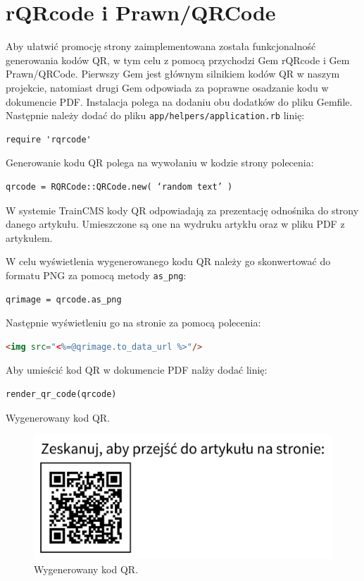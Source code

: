 \documentclass[openright]{xmgr}
\begin{document}
\newpage

\section{rQRcode i Prawn/QRCode}
Aby ułatwić promocję strony zaimplementowana została funkcjonalność generowania kodów QR, w tym celu z pomocą przychodzi Gem rQRcode\cite{rqrcode} i Gem Prawn/QRCode\cite{prawnqr}. Pierwszy Gem jest głównym silnikiem kodów QR w naszym projekcie, natomiast drugi Gem odpowiada za poprawne osadzanie kodu w dokumencie PDF. Instalacja polega na dodaniu obu dodatków do pliku Gemfile. Następnie należy dodać do pliku  \texttt{app/helpers/application.rb} linię:
\begin{lstlisting}[language=ruby2, caption={Kod dołączający rQRcode do projektu}]
require 'rqrcode'
\end{lstlisting}
Generowanie kodu QR polega na wywołaniu w kodzie strony polecenia:
\begin{lstlisting}[language=ruby2, caption={Kod generujący kod QR}]
qrcode = RQRCode::QRCode.new( ‘random text’ )
\end{lstlisting}

W systemie TrainCMS kody QR odpowiadają za prezentację odnośnika do strony danego artykułu. Umieszczone są one na wydruku artykłu oraz w pliku PDF z artykułem.

W celu wyświetlenia wygenerowanego kodu QR należy go skonwertować do formatu PNG za pomocą metody \texttt{as\_png}:
\begin{lstlisting}[language=ruby2, caption={Kod konwertujący kod QR}]
qrimage = qrcode.as_png
\end{lstlisting}
Następnie wyświetleniu go na stronie za pomocą polecenia:
\begin{lstlisting}[language=html, caption={Kod wyświetlający kod QR na stronie HTML}]
<img src="<%=@qrimage.to_data_url %>"/>
\end{lstlisting}
Aby umieścić kod QR w dokumencie PDF nalży dodać linię:
\begin{lstlisting}[language=ruby2, caption={Kod wyświetlający kod QR w dokumencie PDF}]
render_qr_code(qrcode)
\end{lstlisting}

Wygenerowany kod QR.
\begin{figure}[!tbh]
\centering
\includegraphics[width=.6\linewidth]{fig/kodqr}
\caption{Wygenerowany kod QR.}
\end{figure}
\end{document}
